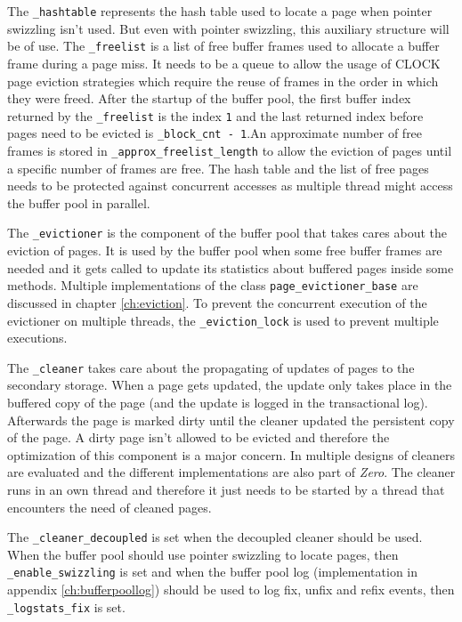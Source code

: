 	The \lstinline{_hashtable} represents the hash table used to locate a page when pointer swizzling isn't used. But even with pointer swizzling, this auxiliary structure will be of use. The \lstinline{_freelist} is a list of free buffer frames used to allocate a buffer frame during a page miss. It needs to be a queue to allow the usage of CLOCK page eviction strategies which require the reuse of frames in the order in which they were freed. After the startup of the buffer pool, the first buffer index returned by the \lstinline{_freelist} is the index \lstinline{1} and the last returned index before pages need to be evicted is \lstinline{_block_cnt - 1}.An approximate number of free frames is stored in \lstinline{_approx_freelist_length} to allow the eviction of pages until a specific number of frames are free. The hash table and the list of free pages needs to be protected against concurrent accesses as multiple thread might access the buffer pool in parallel.

	The \lstinline{_evictioner} is the component of the buffer pool that takes cares about the eviction of pages. It is used by the buffer pool when some free buffer frames are needed and it gets called to update its statistics about buffered pages inside some methods. Multiple implementations of the class \lstinline{page_evictioner_base} are discussed in chapter \ref{ch:eviction}. To prevent the concurrent execution of the evictioner on multiple threads, the \lstinline{_eviction_lock} is used to prevent multiple executions.

	The \lstinline{_cleaner} takes care about the propagating of updates of pages to the secondary storage. When a page gets updated, the update only takes place in the buffered copy of the page (and the update is logged in the transactional log). Afterwards the page is marked dirty until the cleaner updated the persistent copy of the page. A dirty page isn't allowed to be evicted and therefore the optimization of this component is a major concern. In \cite{Sauer:2016} multiple designs of cleaners are evaluated and the different implementations are also part of \emph{Zero}. The cleaner runs in an own thread and therefore it just needs to be started by a thread that encounters the need of cleaned pages.

	The \lstinline{_cleaner_decoupled} is set when the decoupled cleaner should be used. When the buffer pool should use pointer swizzling to locate pages, then \lstinline{_enable_swizzling} is set and when the buffer pool log (implementation in appendix \ref{ch:bufferpoollog}) should be used to log fix, unfix and refix events, then \lstinline{_logstats_fix} is set.

